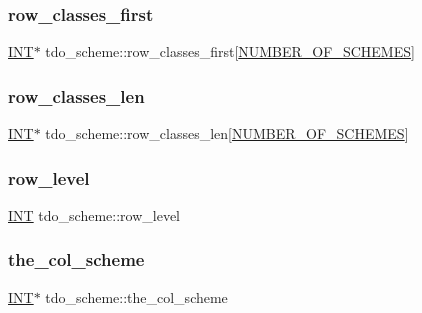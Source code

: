 \subsubsection{\texorpdfstring{row\+\_\+classes\+\_\+first}{row\_classes\_first}}
{\footnotesize\ttfamily \mbox{\hyperlink{galois_8h_a09fddde158a3a20bd2dcadb609de11dc}{I\+NT}}$\ast$ tdo\+\_\+scheme\+::row\+\_\+classes\+\_\+first\mbox{[}\mbox{\hyperlink{incidence_8h_a27f25725c4772efe473058135daeba55}{N\+U\+M\+B\+E\+R\+\_\+\+O\+F\+\_\+\+S\+C\+H\+E\+M\+ES}}\mbox{]}}

\mbox{\label{classtdo__scheme_a6b85425e4b8eb9e9752cc20ba52bf5dd}} 
\subsubsection{\texorpdfstring{row\+\_\+classes\+\_\+len}{row\_classes\_len}}
{\footnotesize\ttfamily \mbox{\hyperlink{galois_8h_a09fddde158a3a20bd2dcadb609de11dc}{I\+NT}}$\ast$ tdo\+\_\+scheme\+::row\+\_\+classes\+\_\+len\mbox{[}\mbox{\hyperlink{incidence_8h_a27f25725c4772efe473058135daeba55}{N\+U\+M\+B\+E\+R\+\_\+\+O\+F\+\_\+\+S\+C\+H\+E\+M\+ES}}\mbox{]}}

\mbox{\label{classtdo__scheme_a39330f3c7c1c275e32d7d313630ed6d2}} 
\subsubsection{\texorpdfstring{row\+\_\+level}{row\_level}}
{\footnotesize\ttfamily \mbox{\hyperlink{galois_8h_a09fddde158a3a20bd2dcadb609de11dc}{I\+NT}} tdo\+\_\+scheme\+::row\+\_\+level}

\mbox{\label{classtdo__scheme_a05ff0ea438e4fdeff7d26f77b81c59db}} 
\subsubsection{\texorpdfstring{the\+\_\+col\+\_\+scheme}{the\_col\_scheme}}
{\footnotesize\ttfamily \mbox{\hyperlink{galois_8h_a09fddde158a3a20bd2dcadb609de11dc}{I\+NT}}$\ast$ tdo\+\_\+scheme\+::the\+\_\+col\+\_\+scheme}

